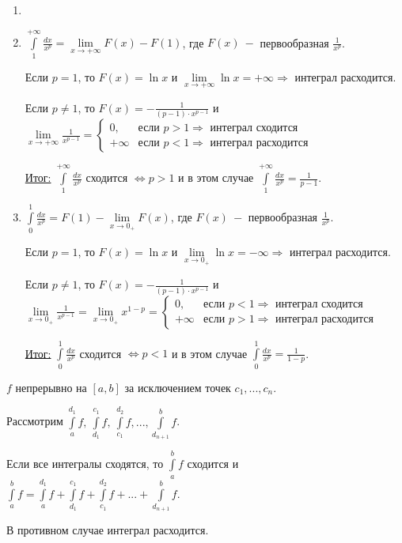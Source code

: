 \begin{example}
    \begin{enumerate}
        \item[]
        \item $\int\limits_1^{+\infty }\frac{dx}{x^p}=\lim\limits_{x\rightarrow +\infty}F(x)-F(1)$, где $F(x)\ -$ первообразная $\frac{1}{x^p}$.

        Если $p=1$, то $F(x)=\ln x$ и $\lim\limits_{x\rightarrow +\infty}\ln x=+\infty\Rightarrow$ интеграл расходится.

        Если $p\neq1$, то $F(x)=-\frac{1}{(p-1)\cdot x^{p-1}}$ и $\lim\limits_{x\rightarrow +\infty}\frac{1}{x^{p-1}}=\begin{cases} 
        0, & \text{если $p>1\Rightarrow$ интеграл сходится} \\
        +\infty & \text{если $p<1\Rightarrow$ интеграл расходится}
        \end{cases}$ 

        \underline{Итог:} $\int\limits_1^{+\infty }\frac{dx}{x^p}$ сходится $\Leftrightarrow p>1$ и в этом случае $\int\limits_1^{+\infty }\frac{dx}{x^p}=\frac{1}{p-1}$.
        \item $\int\limits_0^1\frac{dx}{x^p}=F(1)-\lim\limits_{x\rightarrow 0_+}F(x)$, где $F(x)\ -$ первообразная $\frac{1}{x^p}$.

        Если $p=1$, то $F(x)=\ln x$ и $\lim\limits_{x\rightarrow 0_+}\ln x=-\infty\Rightarrow$ интеграл расходится.

        Если $p\neq1$, то $F(x)=-\frac{1}{(p-1)\cdot x^{p-1}}$ и $\lim\limits_{x\rightarrow 0_+}\frac{1}{x^{p-1}}=\lim\limits_{x\rightarrow 0_+}x^{1-p}=\begin{cases} 
        0, & \text{если $p<1\Rightarrow$ интеграл сходится} \\
        +\infty & \text{если $p>1\Rightarrow$ интеграл расходится}
        \end{cases}$ 

        \underline{Итог:} $\int\limits_0^1\frac{dx}{x^p}$ сходится $\Leftrightarrow p<1$ и в этом случае $\int\limits_0^1\frac{dx}{x^p}=\frac{1}{1-p}$.
    \end{enumerate}
\end{example}

\begin{definition}
    $f$ непрерывно на $[a,b]$ за исключением точек $c_1,...,c_n$. 
    
    Рассмотрим $\int\limits_a^{d_1} f,\ \int\limits_{d_1}^{c_1} f,\ \int\limits_{c_1}^{d_2} f,..., \int\limits_{d_{n+1}}^{b} f$.
    
    Если все интегралы сходятся, то $\int\limits_a^b f$ сходится и $\int\limits_a^b f=\int\limits_a^{d_1} f+\int\limits_{d_1}^{c_1} f+ \int\limits_{c_1}^{d_2} f+...+ \int\limits_{d_{n+1}}^{b} f$. 

    В противном случае интеграл расходится.
\end{definition}

